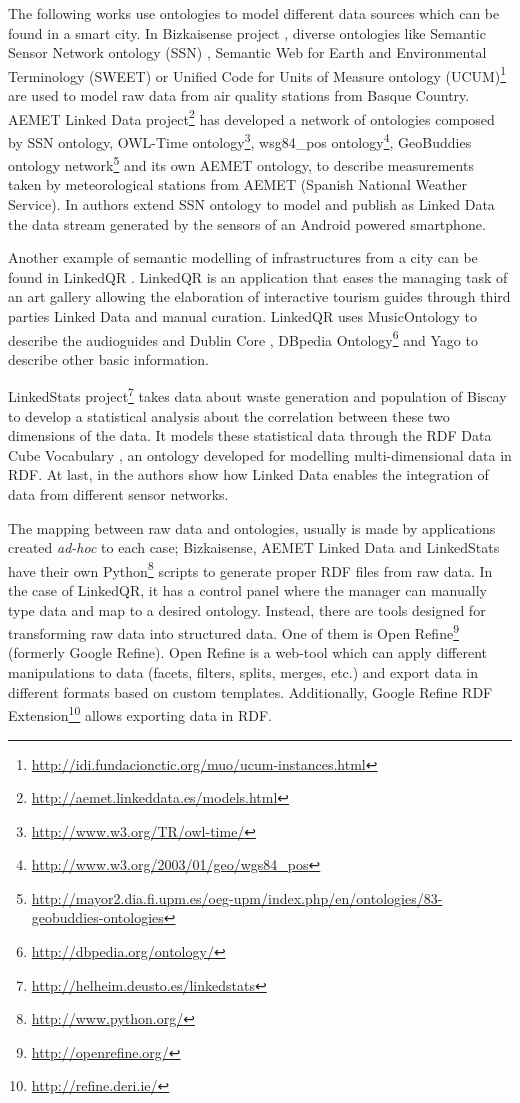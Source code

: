 The following works use ontologies to model different data sources which can be found in a smart city. In Bizkaisense project \cite{emaldi_short_2012}, diverse ontologies like Semantic Sensor Network ontology (SSN) \cite{lefort_semantic_2011}, Semantic Web for Earth and Environmental Terminology (SWEET) \cite{raskin_knowledge_2005} or Unified Code for Units of Measure ontology (UCUM)\footnote{\url{http://idi.fundacionctic.org/muo/ucum-instances.html}} are used to model raw data from air quality stations from Basque Country. AEMET Linked Data project\footnote{\url{http://aemet.linkeddata.es/models.html}} has developed a network of ontologies composed by SSN ontology, OWL-Time ontology\footnote{\url{http://www.w3.org/TR/owl-time/}}, wsg84\_pos ontology\footnote{\url{http://www.w3.org/2003/01/geo/wgs84_pos}}, GeoBuddies ontology network\footnote{\url{http://mayor2.dia.fi.upm.es/oeg-upm/index.php/en/ontologies/83-geobuddies-ontologies}} and its own AEMET ontology, to describe measurements taken by meteorological stations from AEMET (Spanish National Weather Service). In \cite{d2011enabling} authors extend SSN ontology to model and publish as Linked Data the data stream generated by the sensors of an Android powered smartphone.

Another example of semantic modelling of infrastructures from a city can be found in LinkedQR \cite{emaldi2012linkedqr}. LinkedQR is an application that eases the managing task of an art gallery allowing the elaboration of interactive tourism guides through third parties Linked Data and manual curation. LinkedQR uses MusicOntology \cite{raimond2007music} to describe the audioguides and Dublin Core \cite{weibel1998dublin}, DBpedia Ontology\footnote{\url{http://dbpedia.org/ontology/}} and Yago \cite{suchanek2007yago} to describe other basic information.

LinkedStats project\footnote{\url{http://helheim.deusto.es/linkedstats}} takes data about waste generation and population of Biscay to develop a statistical analysis about the correlation between these two dimensions of the data. It models these statistical data through the RDF Data Cube Vocabulary \cite{_rdf_2013}, an ontology developed for modelling multi-dimensional data in RDF. At last, in \cite{stasch2011aggregating} the authors show how Linked Data enables the integration of data from different sensor networks.

The mapping between raw data and ontologies, usually is made by applications created \textit{ad-hoc} to each case; Bizkaisense, AEMET Linked Data and LinkedStats have their own Python\footnote{\url{http://www.python.org/}} scripts to generate proper RDF files from raw data. In the case of LinkedQR, it has a control panel where the manager can manually type data and map to a desired ontology. Instead, there are tools designed for transforming raw data into structured data. One of them is Open Refine\footnote{\url{http://openrefine.org/}} (formerly Google Refine). Open Refine is a web-tool which can apply different manipulations to data (facets, filters, splits, merges, etc.) and export data in different formats based on custom templates. Additionally, Google Refine RDF Extension\footnote{\url{http://refine.deri.ie/}} allows exporting data in RDF.

